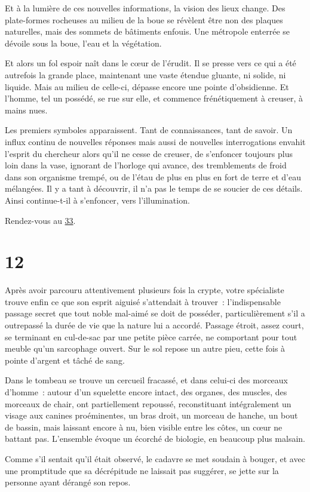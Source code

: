 \documentclass{report}
\newcommand{\gsection}[1]{
    \section{#1}
    \label{section-#1}
}
\newcommand{\glink}[1]{\hyperref[section-#1]{#1}}
\begin{document}
Et à la lumière de ces nouvelles informations, la vision des lieux change. Des plate-formes rocheuses au milieu de la boue se révèlent être non des plaques naturelles, mais des sommets de bâtiments enfouis. Une métropole enterrée se dévoile sous la boue, l'eau et la végétation.

Et alors un fol espoir naît dans le cœur de l'érudit. Il se presse vers ce qui a été autrefois la grande place, maintenant une vaste étendue gluante, ni solide, ni liquide. Mais au milieu de celle-ci, dépasse encore une pointe d'obsidienne. Et l'homme, tel un possédé, se rue sur elle, et commence frénétiquement à creuser, à mains nues.

Les premiers symboles apparaissent. Tant de connaissances, tant de savoir. Un influx continu de nouvelles réponses mais aussi de nouvelles interrogations envahit l'esprit du chercheur alors qu'il ne cesse de creuser, de s'enfoncer toujours plus loin dans la vase, ignorant de l'horloge qui avance, des tremblements de froid dans son organisme trempé, ou de l'étau de plus en plus en fort de terre et d'eau mélangées. Il y a tant à découvrir, il n'a pas le temps de se soucier de ces détails. Ainsi continue-t-il à s'enfoncer, vers l'illumination.

Rendez-vous au \glink{33}.

\gsection{12}

Après avoir parcouru attentivement plusieurs fois la crypte, votre spécialiste trouve enfin ce que son esprit aiguisé s'attendait à trouver : l'indispensable passage secret que tout noble mal-aimé se doit de posséder, particulièrement s'il a outrepassé la durée de vie que la nature lui a accordé. Passage étroit, assez court, se terminant en cul-de-sac par une petite pièce carrée, ne comportant pour tout meuble qu'un sarcophage ouvert. Sur le sol repose un autre pieu, cette fois à pointe d'argent et tâché de sang.

Dans le tombeau se trouve un cercueil fracassé, et dans celui-ci des morceaux d'homme : autour d'un squelette encore intact, des organes, des muscles, des morceaux de chair, ont partiellement repoussé, reconstituant intégralement un visage aux canines proéminentes, un bras droit, un morceau de hanche, un bout de bassin, mais laissant encore à nu, bien visible entre les côtes, un cœur ne battant pas. L'ensemble évoque un écorché de biologie, en beaucoup plus malsain.

Comme s'il sentait qu'il était observé, le cadavre se met soudain à bouger, et avec une promptitude que sa décrépitude ne laissait pas suggérer, se jette sur la personne ayant dérangé son repos.
\end{document}
